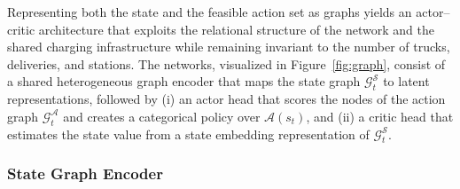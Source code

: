 \documentclass[journal]{IEEEtran}
\begin{document}
Representing both the state and the feasible action set as graphs yields an actor--critic architecture that exploits the relational structure of the network and the shared charging infrastructure while remaining invariant to the number of trucks, deliveries, and stations. The networks, visualized in Figure~\ref{fig:graph}, consist of a shared heterogeneous graph encoder that maps the state graph $\mathcal{G}^{\mathcal{S}}_t$ to latent representations, followed by (i) an actor head that scores the nodes of the action graph $\mathcal{G}_t^{\mathcal{A}}$ and creates a categorical policy over $\mathcal{A}(s_t)$, and (ii) a critic head that estimates the state value from a state embedding representation of $\mathcal{G}^{\mathcal{S}}_t$.

\subsubsection{State Graph Encoder}
\end{document}
